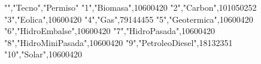 "","Tecno","Permiso"
"1","Biomasa",10600420
"2","Carbon",101050252
"3","Eolica",10600420
"4","Gas",79144455
"5","Geotermica",10600420
"6","HidroEmbalse",10600420
"7","HidroPasada",10600420
"8","HidroMiniPasada",10600420
"9","PetroleoDiesel",18132351
"10","Solar",10600420